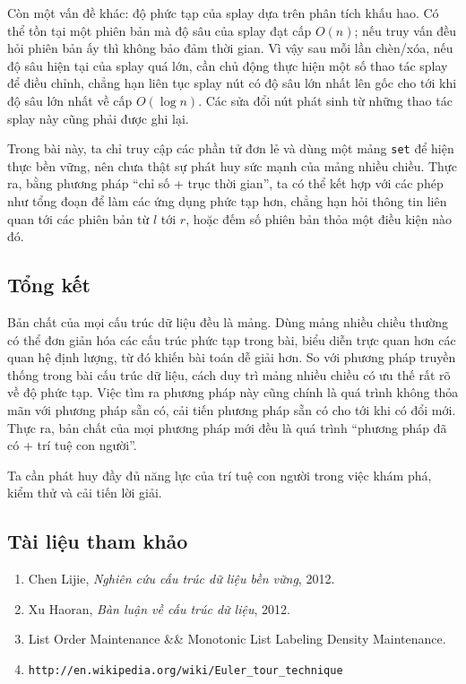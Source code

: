 \documentclass[11pt]{article}
\begin{document}
Còn một vấn đề khác: độ phức tạp của splay dựa trên phân tích khấu hao. Có thể
tồn tại một phiên bản mà độ sâu của splay đạt cấp \(O(n)\); nếu truy vấn đều
hỏi phiên bản ấy thì không bảo đảm thời gian. Vì vậy sau mỗi lần chèn/xóa, nếu
độ sâu hiện tại của splay quá lớn, cần chủ động thực hiện một số thao tác
splay để điều chỉnh, chẳng hạn liên tục splay nút có độ sâu lớn nhất lên gốc
cho tới khi độ sâu lớn nhất về cấp \(O(\log n)\). Các sửa đổi nút phát sinh từ
những thao tác splay này cũng phải được ghi lại.

Trong bài này, ta chỉ truy cập các phần tử đơn lẻ và dùng một mảng \texttt{set}
để hiện thực bền vững, nên chưa thật sự phát huy sức mạnh của mảng nhiều
chiều. Thực ra, bằng phương pháp ``chỉ số + trục thời gian'', ta có thể kết hợp
với các phép như tổng đoạn để làm các ứng dụng phức tạp hơn, chẳng hạn hỏi
thông tin liên quan tới các phiên bản từ \(l\) tới \(r\), hoặc đếm số phiên bản
thỏa một điều kiện nào đó.

\subsection{Tổng kết}

Bản chất của mọi cấu trúc dữ liệu đều là mảng. Dùng mảng nhiều chiều thường có
thể đơn giản hóa các cấu trúc phức tạp trong bài, biểu diễn trực quan hơn các
quan hệ định lượng, từ đó khiến bài toán dễ giải hơn. So với phương pháp
truyền thống trong bài cấu trúc dữ liệu, cách duy trì mảng nhiều chiều có ưu
thế rất rõ về độ phức tạp. Việc tìm ra phương pháp này cũng chính là quá trình
không thỏa mãn với phương pháp sẵn có, cải tiến phương pháp sẵn có cho tới khi
có đổi mới. Thực ra, bản chất của mọi phương pháp mới đều là quá trình
``phương pháp đã có + trí tuệ con người''.

Ta cần phát huy đầy đủ năng lực của trí tuệ con người trong việc khám phá,
kiểm thử và cải tiến lời giải.

\subsection*{Tài liệu tham khảo}

\begin{enumerate}
  \item Chen Lijie, \emph{Nghiên cứu cấu trúc dữ liệu bền vững}, 2012.
  \item Xu Haoran, \emph{Bàn luận về cấu trúc dữ liệu}, 2012.
  \item List Order Maintenance \&\& Monotonic List Labeling Density
  Maintenance.
  \item \texttt{http://en.wikipedia.org/wiki/Euler\_tour\_technique}
\end{enumerate}
\end{document}
